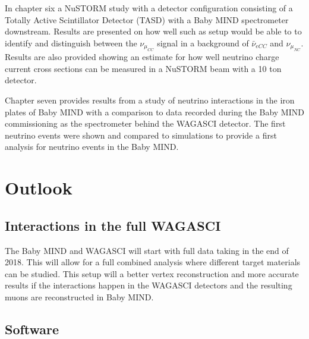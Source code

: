 In chapter six a NuSTORM study with a detector configuration consisting of a Totally Active Scintillator Detector (TASD) with a Baby MIND spectrometer downstream. Results are presented on how well such as setup would be able to to identify and distinguish between the $\nu_{\mu_{CC}}$ signal in a background of $\bar{\nu}_{eCC}$ and $\nu_{\mu_{NC}}$. Results are also provided showing an estimate for how well neutrino charge current cross sections can be measured in a NuSTORM beam with a 10 ton detector.

Chapter seven provides results from a study of neutrino interactions in the iron plates of Baby MIND with a comparison to data recorded during the Baby MIND commissioning as the spectrometer behind the WAGASCI detector. The first neutrino events were shown and compared to simulations to provide a first analysis for neutrino events in the Baby MIND.



\section{Outlook}


\subsection{Interactions in the full WAGASCI}
The Baby MIND and WAGASCI will start with full data taking in the end of 2018. This will allow for a full combined analysis where different target materials can be studied. This setup will a better vertex reconstruction and more accurate results if the interactions happen in the WAGASCI detectors and the resulting muons are reconstructed in Baby MIND.


\subsection{Software}


